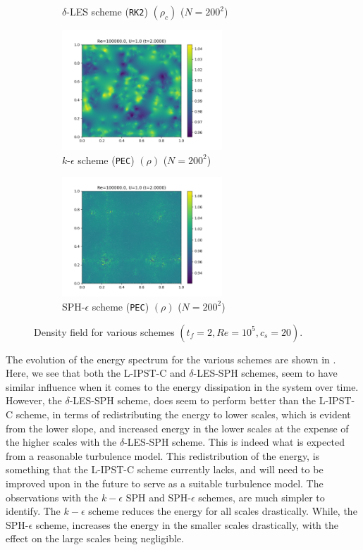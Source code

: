 \begin{figure}[htbp!]
\begin{subfigure}{7cm}
  \caption{$\delta$-LES scheme (\texttt{RK2}) $(\rho_c)$ ($N=200^2$)}
  \end{subfigure}
  \begin{subfigure}{7cm}
  \centering\includegraphics[width=6cm]{Code-Figures/long-tgv/c0_20_tait_hdx_2_pec_dtmul_1_no_n_o_files_50_nx_200_pst_10_re_100000_k_eps_tf_2/final_rho.png}
  \caption{$k$-$\epsilon$ scheme (\texttt{PEC}) $(\rho)$ ($N=200^2$)}
  \end{subfigure}
  \begin{subfigure}{7cm}
  \centering\includegraphics[width=6cm]{Code-Figures/long-tgv/c0_20_tait_hdx_2_pec_dtmul_1_mon2017_eps_0.5_no_n_o_files_50_nx_200_pst_10_re_100000_mon2017_tf_2/final_rho.png}
  \caption{SPH-$\epsilon$ scheme (\texttt{PEC}) $(\rho)$ ($N=200^2$)}
  \end{subfigure}
  \caption{Density field for various schemes $(t_f=2, Re=10^5, c_s=20)$.}
  \label{fig:ltgv-scheme-density}
\end{figure}


The evolution of the energy spectrum for the various schemes are shown in .
Here, we see that both the L-IPST-C and $\delta$-LES-SPH schemes, seem to have similar influence when it comes to the energy dissipation in the system over time. However, the $\delta$-LES-SPH scheme, does seem to perform better than the L-IPST-C scheme, in terms of redistributing the energy to lower scales, which is evident from the lower slope, and increased energy in the lower scales at the expense of the higher scales with the $\delta$-LES-SPH scheme. This is indeed what is expected from a reasonable turbulence model. This redistribution of the energy, is something that the L-IPST-C scheme currently lacks, and will need to be improved upon in the future to serve as a suitable turbulence model.
The observations with the $k-\epsilon$ SPH and SPH-$\epsilon$ schemes, are much simpler to identify. The $k-\epsilon$ scheme reduces the energy for all scales drastically. While, the SPH-$\epsilon$ scheme, increases the energy in the smaller scales drastically, with the effect on the large scales being negligible.

